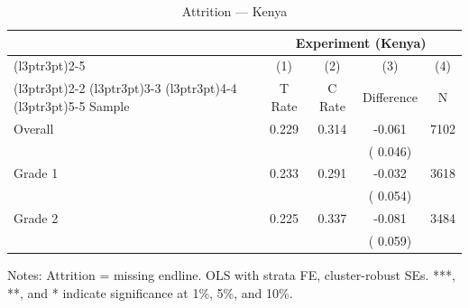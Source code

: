 \begin{table}[!h]
\centering
\caption{Attrition --- Kenya}
\label{tab:ke_attrition}
\begin{threeparttable}
\begin{tabular}[t]{lcccc}
\toprule
\multicolumn{1}{c}{ } & \multicolumn{4}{c}{Experiment (Kenya)} \\
\cmidrule(l{3pt}r{3pt}){2-5}
\multicolumn{1}{c}{ } & \multicolumn{1}{c}{(1)} & \multicolumn{1}{c}{(2)} & \multicolumn{1}{c}{(3)} & \multicolumn{1}{c}{(4)} \\
\cmidrule(l{3pt}r{3pt}){2-2} \cmidrule(l{3pt}r{3pt}){3-3} \cmidrule(l{3pt}r{3pt}){4-4} \cmidrule(l{3pt}r{3pt}){5-5}
Sample & T Rate & C Rate & Difference & N \\
\midrule
Overall & 0.229 & 0.314 &  -0.061 & 7102 \\
 & & & (  0.046) & \\
Grade 1 & 0.233 & 0.291 &  -0.032 & 3618 \\
 & & & (  0.054) & \\
Grade 2 & 0.225 & 0.337 &  -0.081 & 3484 \\
 & & & (  0.059) & \\
\bottomrule
\end{tabular}
\begin{tablenotes}[para]
\item Notes: Attrition = missing endline. OLS with strata FE, cluster-robust SEs. ***, **, and * indicate significance at 1\%, 5\%, and 10\%.
\end{tablenotes}
\end{threeparttable}
\end{table}
